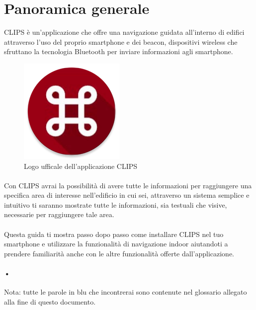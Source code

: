 \documentclass[../ClipsManualeUtente.tex]{subfiles}
\begin{document}
\section{Panoramica generale}

	CLIPS è un'applicazione che offre una navigazione guidata all'interno di edifici attraverso l'uso del proprio smartphone e dei \gls{beacon}, dispositivi wireless che sfruttano la tecnologia \gls{Bluetooth} per inviare informazioni agli smartphone.

	\begin{figure} [h]
		\centering
		\includegraphics[scale=0.5]{img/BigLogoApp}
		\caption{Logo ufficale dell'applicazione CLIPS}
		\label{fig:BigLogoApp}
	\end{figure}	
	
	\paragraph*{}
	Con CLIPS avrai la possibilità di avere tutte le informazioni per raggiungere una specifica area di interesse nell'edificio in cui sei, attraverso un sistema semplice e intuitivo ti saranno mostrate tutte le informazioni, sia testuali che visive, necessarie per raggiungere tale area.
	\paragraph*{}
	Questa guida ti mostra passo dopo passo come installare CLIPS nel tuo smartphone e utilizzare la funzionalità di \gls{navigazione indoor} aiutandoti a prendere familiarità anche con le altre funzionalità offerte dall'applicazione.
	\paragraph*{•}
	 \begin{framed}
	 Nota: tutte le parole in blu che incontrerai sono contenute nel glossario allegato alla fine di questo documento.
	 \end{framed}
	
\end{document}
